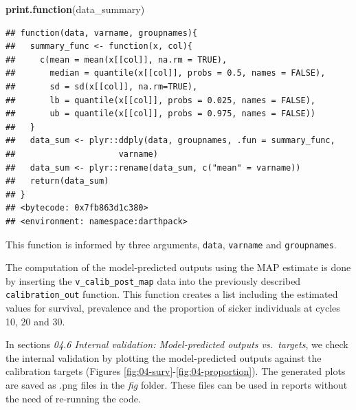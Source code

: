 \documentclass[]{book}
\newenvironment{Shaded}{\begin{snugshade}}{\end{snugshade}}
\newcommand{\KeywordTok}[1]{\textcolor[rgb]{0.13,0.29,0.53}{\textbf{#1}}}
\newcommand{\NormalTok}[1]{#1}
\begin{document}
\begin{Shaded}
\begin{Highlighting}[]
\KeywordTok{print.function}\NormalTok{(data_summary)}
\end{Highlighting}
\end{Shaded}

\begin{verbatim}
## function(data, varname, groupnames){
##   summary_func <- function(x, col){
##     c(mean = mean(x[[col]], na.rm = TRUE),
##       median = quantile(x[[col]], probs = 0.5, names = FALSE),
##       sd = sd(x[[col]], na.rm=TRUE),
##       lb = quantile(x[[col]], probs = 0.025, names = FALSE),
##       ub = quantile(x[[col]], probs = 0.975, names = FALSE))
##   }
##   data_sum <- plyr::ddply(data, groupnames, .fun = summary_func, 
##                     varname)
##   data_sum <- plyr::rename(data_sum, c("mean" = varname))
##   return(data_sum)
## }
## <bytecode: 0x7fb863d1c380>
## <environment: namespace:darthpack>
\end{verbatim}

This function is informed by three arguments, \texttt{data},
\texttt{varname} and \texttt{groupnames}.

The computation of the model-predicted outputs using the MAP estimate is
done by inserting the \texttt{v\_calib\_post\_map} data into the
previously described \texttt{calibration\_out} function. This function
creates a list including the estimated values for survival, prevalence
and the proportion of sicker individuals at cycles 10, 20 and 30.

In sections \emph{04.6 Internal validation: Model-predicted outputs
vs.~targets}, we check the internal validation by plotting the
model-predicted outputs against the calibration targets (Figures
\ref{fig:04-surv}-\ref{fig:04-proportion}). The generated plots are
saved as .png files in the \emph{fig} folder. These files can be used in
reports without the need of re-running the code.
\end{document}
